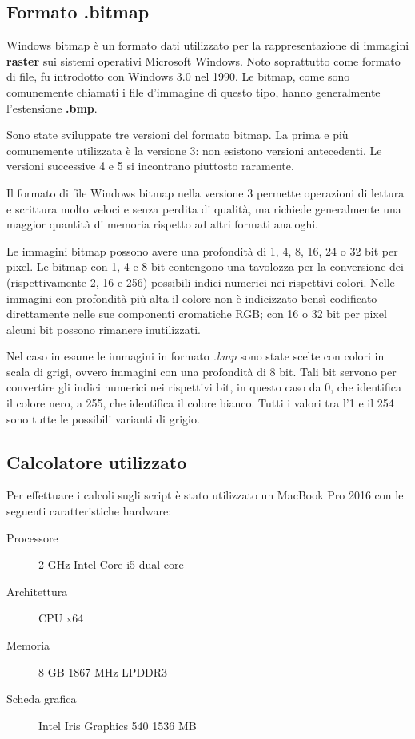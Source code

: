 \documentclass[preprint,12pt]{elsarticle}
\begin{document}
\subsection*{Formato .bitmap}
Windows bitmap è un formato dati utilizzato per la rappresentazione di immagini \textbf{raster} sui sistemi operativi Microsoft Windows. Noto soprattutto come formato di file, fu introdotto con Windows 3.0 nel 1990.
Le bitmap, come sono comunemente chiamati i file d'immagine di questo tipo, hanno generalmente l'estensione \textbf{.bmp}.

Sono state sviluppate tre versioni del formato bitmap. La prima e più comunemente utilizzata è la versione 3: non esistono versioni antecedenti. Le versioni successive 4 e 5 si incontrano piuttosto raramente.

Il formato di file Windows bitmap nella versione 3 permette operazioni di lettura e scrittura molto veloci e senza perdita di qualità, ma richiede generalmente una maggior quantità di memoria rispetto ad altri formati analoghi.

Le immagini bitmap possono avere una profondità di 1, 4, 8, 16, 24 o 32 bit per pixel. Le bitmap con 1, 4 e 8 bit contengono una tavolozza per la conversione dei (rispettivamente 2, 16 e 256) possibili indici numerici nei rispettivi colori. Nelle immagini con profondità più alta il colore non è indicizzato bensì codificato direttamente nelle sue componenti cromatiche RGB; con 16 o 32 bit per pixel alcuni bit possono rimanere inutilizzati.

Nel caso in esame le immagini in formato \textit{.bmp} sono state scelte con colori in scala di grigi, ovvero immagini con una profondità di 8 bit. Tali bit servono per convertire gli indici numerici nei rispettivi bit, in questo caso da 0, che identifica il colore nero, a 255, che identifica il colore bianco. Tutti i valori tra l'1 e il 254 sono tutte le possibili varianti di grigio.

\subsection*{Calcolatore utilizzato}
Per effettuare i calcoli sugli script è stato utilizzato un MacBook Pro 2016 con le seguenti caratteristiche hardware:
\begin{description}
\item[Processore] 2 GHz Intel Core i5 dual-core
\item[Architettura] CPU x64
\item[Memoria] 8 GB 1867 MHz LPDDR3
\item[Scheda grafica] Intel Iris Graphics 540 1536 MB
\end{description}
\end{document}
